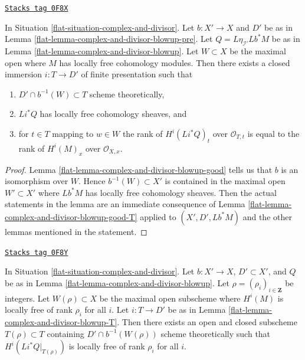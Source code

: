 \begin{lemma}
\label{flat-lemma-complex-and-divisor-blowup-T}
\href{https://stacks.math.columbia.edu/tag/0F8X}{\texttt{Stacks tag 0F8X}}

In Situation \ref{flat-situation-complex-and-divisor}. Let $b : X' \to X$
and $D'$ be as in Lemma \ref{flat-lemma-complex-and-divisor-blowup-pre}. Let
$Q = L\eta_{\mathcal{I}'}Lb^*M$ be as in
Lemma \ref{flat-lemma-complex-and-divisor-blowup}.
Let $W \subset X$ be the maximal open where $M$ has
locally free cohomology modules.
Then there exists a closed immersion $i : T \to D'$ of finite presentation
such that
\begin{enumerate}
\item $D' \cap b^{-1}(W) \subset T$ scheme theoretically,
\item $Li^*Q$ has locally free cohomology sheaves, and
\item for $t \in T$ mapping to $w \in W$ the rank
of $H^i(Li^*Q)_t$ over $\mathcal{O}_{T, t}$ is equal to the
rank of $H^i(M)_x$ over $\mathcal{O}_{X, x}$.
\end{enumerate}
\end{lemma}

\begin{proof}

Lemma \ref{flat-lemma-complex-and-divisor-blowup-good} tells us that
$b$ is an isomorphism over $W$. Hence $b^{-1}(W) \subset X'$
is contained in the maximal open $W' \subset X'$ where $Lb^*M$
has locally free cohomology sheaves. Then the actual statements
in the lemma are an immediate consequence of
Lemma \ref{flat-lemma-complex-and-divisor-blowup-good-T} applied
to $(X', D', Lb^*M)$ and the other lemmas mentioned in the statement.
\end{proof}

\begin{lemma}
\label{flat-lemma-complex-and-divisor-blowup-T-ranks}
\href{https://stacks.math.columbia.edu/tag/0F8Y}{\texttt{Stacks tag 0F8Y}}

In Situation \ref{flat-situation-complex-and-divisor}. Let $b : X' \to X$,
$D' \subset X'$, and $Q$ be as in
Lemma \ref{flat-lemma-complex-and-divisor-blowup}.
Let $\rho = (\rho_i)_{i \in \mathbf{Z}}$ be integers.
Let $W(\rho) \subset X$ be the maximal open subscheme where
$H^i(M)$ is locally free of rank $\rho_i$ for all $i$.
Let $i : T \to D'$ be as in Lemma \ref{flat-lemma-complex-and-divisor-blowup-T}.
Then there exists an open and closed subscheme $T(\rho) \subset T$
containing $D' \cap b^{-1}(W(\rho))$ scheme theoretically
such that $H^i(Li^*Q|_{T(\rho)})$ is locally free of rank $\rho_i$
for all $i$.
\end{lemma}

